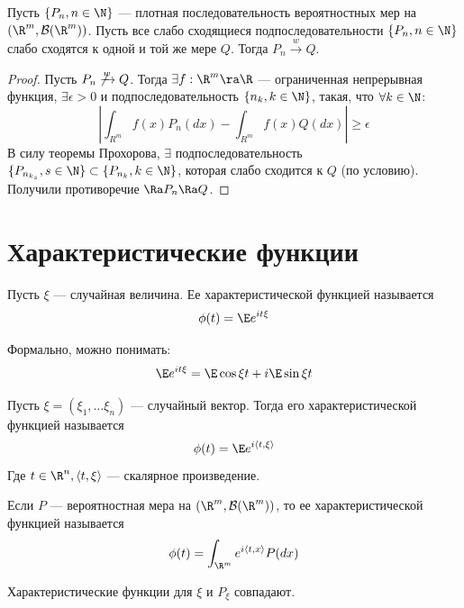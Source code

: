 \begin{corollary}
    Пусть \(\{P_n, n \in \N\}\) --- плотная последовательность вероятностных мер на \((\R^m, \mathcal{B}(\R^m))\). Пусть все слабо сходящиеся подпоследовательности \(\{P_n, n \in \N\}\) слабо сходятся к одной и той же мере \(Q\). Тогда \(P_n \xrightarrow{w} Q\).
\end{corollary}
\begin{proof}
    Пусть \(P_n \not\xrightarrow{w} Q\). Тогда \(\exists f: \R^m \ra \R\) --- ограниченная непрерывная функция, \(\exists \epsilon > 0\) и подпоследовательность \(\{n_k, k \in \N\}\), такая, что \(\forall k \in \N\):
    \[\left| \int_{R^m}f(x)P_n(dx) - \int_{R^m} f(x)Q(dx) \right| \ge \epsilon\]
    В силу теоремы Прохорова, \(\exists\) подпоследовательность \(\{P_{n_{k_s}}, s \in \N\} \subset \{P_{n_k}, k \in \N\}\), которая слабо сходится к \(Q\) (по условию). Получили противоречие \(\Ra P_n \Ra Q\).
\end{proof}


\section{Характеристические функции}

\begin{definition}
    Пусть \(\xi\) --- случайная величина. Ее характеристической функцией называется
    \[\phi(t) = \E e^{it\xi}\]
\end{definition}

\begin{note}
    Формально, можно понимать:
    \[\E e^{it\xi} = \E\cos\xi t + i\E\sin\xi t\]
\end{note}

\begin{definition}
    Пусть \(\xi = (\xi_1, \dots \xi_n)\) --- случайный вектор. Тогда его характеристической функцией называется
    \[\phi(t) = \E e^{i \langle t, \xi \rangle}\]
    Где \(t \in \R^n, \langle t, \xi \rangle\) --- скалярное произведение.
\end{definition}

\begin{definition}
    Если \(P\) --- вероятностная мера на \((\R^m, \mathcal{B}(\R^m))\), то ее характеристической функцией называется
    \[\phi(t) = \int_{\R^m} e^{i \langle t, x \rangle} P(dx)\]
\end{definition}

\begin{note}
    Характеристические функции для \(\xi\) и \(P_\xi\) совпадают.
\end{note}

